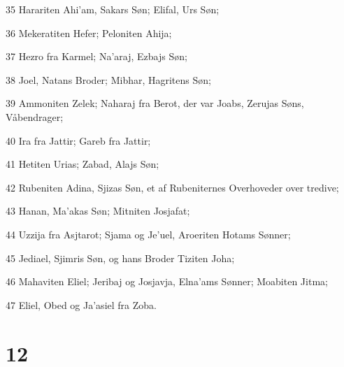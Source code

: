 \par 35 Harariten Ahi'am, Sakars Søn; Elifal, Urs Søn;
\par 36 Mekeratiten Hefer; Peloniten Ahija;
\par 37 Hezro fra Karmel; Na'araj, Ezbajs Søn;
\par 38 Joel, Natans Broder; Mibhar, Hagritens Søn;
\par 39 Ammoniten Zelek; Naharaj fra Berot, der var Joabs, Zerujas Søns, Våbendrager;
\par 40 Ira fra Jattir; Gareb fra Jattir;
\par 41 Hetiten Urias; Zabad, Alajs Søn;
\par 42 Rubeniten Adina, Sjizas Søn, et af Rubeniternes Overhoveder over tredive;
\par 43 Hanan, Ma'akas Søn; Mitniten Josjafat;
\par 44 Uzzija fra Asjtarot; Sjama og Je'uel, Aroeriten Hotams Sønner;
\par 45 Jediael, Sjimris Søn, og hans Broder Tiziten Joha;
\par 46 Mahaviten Eliel; Jeribaj og Josjavja, Elna'ams Sønner; Moabiten Jitma;
\par 47 Eliel, Obed og Ja'asiel fra Zoba.

\chapter{12}

